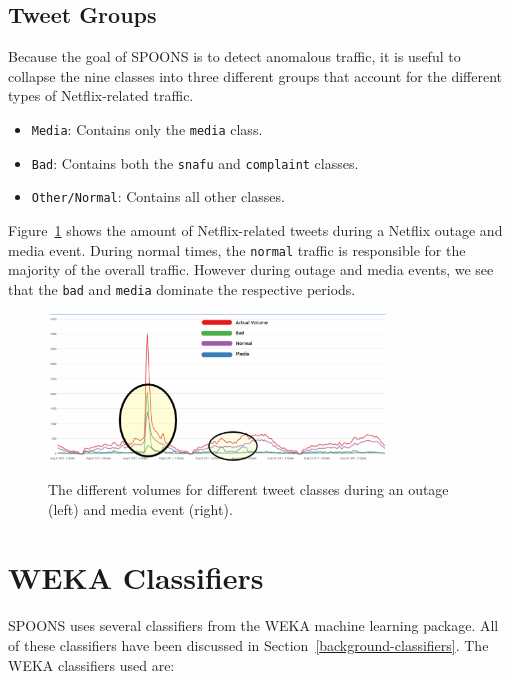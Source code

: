 \documentclass[12pt]{ucthesis}
\newcommand{\captionfonts}{\small\bf\ssp}
\begin{document}
\subsection{Tweet Groups}
\label{class-tweet-groups}
Because the goal of SPOONS is to detect anomalous traffic, it is useful to collapse the nine classes into
three different groups that account for the different types of Netflix-related traffic.

\begin{itemize}
  \item \texttt{Media}: Contains only the \texttt{media} class.
  \item \texttt{Bad}: Contains both the \texttt{snafu} and \texttt{complaint} classes.
  \item \texttt{Other/Normal}: Contains all other classes.
\end{itemize}

Figure~\ref{fig:groups} shows the amount of Netflix-related tweets during a Netflix outage and media event.
During normal times, the \texttt{normal} traffic is responsible for the majority of the overall traffic.
However during outage and media events, we see that the \texttt{bad} and \texttt{media} dominate the respective
periods.

\begin{figure}
   \begin{center}
      \includegraphics[width=0.8\textwidth]{images/groups.eps}
      \captionfonts
      \caption[SPOONS Groups]{The different volumes for different tweet classes during an outage (left) and media event (right).}
      \label{fig:groups}
   \end{center}
\end{figure}

\section{WEKA Classifiers}
\label{class-weka}
SPOONS uses several classifiers from the WEKA machine learning package\cite{weka}.
All of these classifiers have been discussed in Section~\ref{background-classifiers}.
The WEKA classifiers used are:
\end{document}
